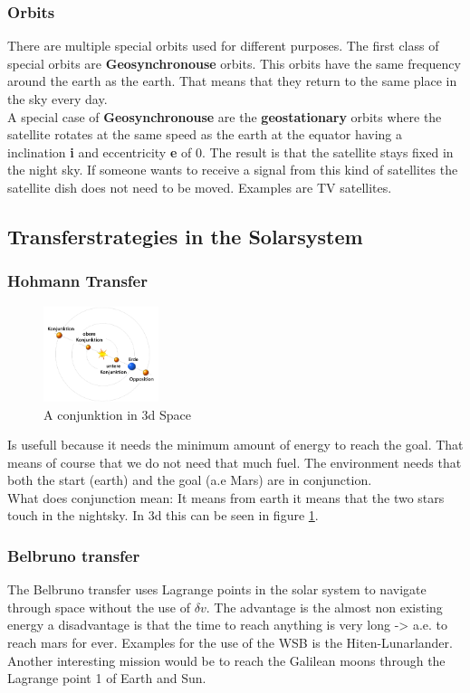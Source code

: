 \subsubsection{Orbits}
There are multiple special orbits used for different purposes. The first class of special orbits are \textbf{Geosynchronouse } orbits. This orbits have the same frequency around the earth as the earth. That means that they return to the same place in the sky every day.\\A special case of \textbf{Geosynchronouse} are the \textbf{geostationary} orbits where the satellite rotates at the same speed as the earth at the equator having a inclination \textbf{i} and eccentricity \textbf{e} of 0. The result is that the satellite stays fixed in the night sky. If someone wants to receive a signal from this kind of satellites the satellite dish does not need to be moved. Examples are TV satellites.

\subsection{Transferstrategies in the Solarsystem}

\subsubsection{Hohmann Transfer}
\begin{figure}
\centering
\includegraphics[width=0.3\textwidth]{images/Foliensatz2_konjunktion.png}
\caption{A conjunktion in 3d Space}
\label{img:Foliensatz1:conjunktion}
\end{figure}
Is usefull because it needs the minimum amount of energy to reach the goal. That means of course that we do not need that much fuel. The environment needs that both the start (earth) and the goal (a.e Mars) are in conjunction.\\ What does conjunction mean: It means from earth it means that the two stars touch in the nightsky. In 3d this can be seen in figure \ref{img:Foliensatz1:conjunktion}.

\subsubsection{Belbruno transfer}
The Belbruno transfer uses Lagrange points in the solar system to navigate through space without the use of $\delta v$. The advantage is the almost non existing energy a disadvantage is that the time to reach anything is very long -> a.e. to reach mars for ever. Examples for the use of the \ac{WSB} is the Hiten-Lunarlander. Another interesting mission would be to reach the Galilean moons through the Lagrange point 1 of Earth and Sun.

